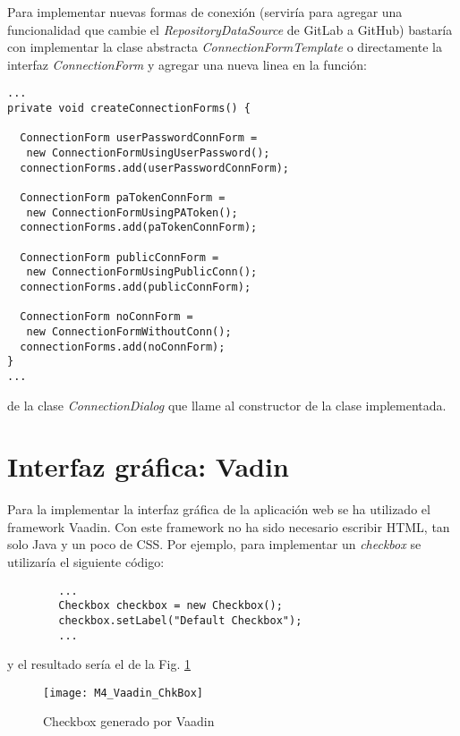  Para implementar nuevas formas de conexión (serviría para agregar una funcionalidad que cambie el \textit{RepositoryDataSource} de GitLab a GitHub) bastaría con implementar la clase abstracta \textit{ConnectionFormTemplate} o directamente la interfaz \textit{ConnectionForm} y agregar una nueva linea en la función:\\
\begin{minipage}{\linewidth}
{\tiny
\begin{lstlisting}[breaklines]
...
private void createConnectionForms() {

  ConnectionForm userPasswordConnForm = 
   new ConnectionFormUsingUserPassword();
  connectionForms.add(userPasswordConnForm);

  ConnectionForm paTokenConnForm = 
   new ConnectionFormUsingPAToken();
  connectionForms.add(paTokenConnForm);

  ConnectionForm publicConnForm = 
   new ConnectionFormUsingPublicConn();
  connectionForms.add(publicConnForm);

  ConnectionForm noConnForm = 
   new ConnectionFormWithoutConn();
  connectionForms.add(noConnForm);
}
...
\end{lstlisting}
}
\end{minipage}
 de la clase \textit{ConnectionDialog} que llame al constructor de la clase implementada.
 
\section{Interfaz gráfica: Vadin}

Para la implementar la interfaz gráfica de la aplicación web se ha utilizado el framework Vaadin. Con este framework no ha sido necesario escribir HTML, tan solo Java y un poco de CSS. Por ejemplo, para implementar un \textit{checkbox} se utilizaría el siguiente código:

\begin{minipage}{\linewidth}
	{\tiny \begin{lstlisting}
		...
		Checkbox checkbox = new Checkbox();
		checkbox.setLabel("Default Checkbox");
		...
		\end{lstlisting}}
\end{minipage}	
y el resultado sería el de la Fig. \ref{fig:M5_Vaadin_ChkBox}
\begin{figure}[!h]
	\centering
	\texttt{[image: M4\_Vaadin\_ChkBox]}
	\caption{Checkbox generado por Vaadin}\label{fig:M5_Vaadin_ChkBox}
\end{figure}
\FloatBarrier

